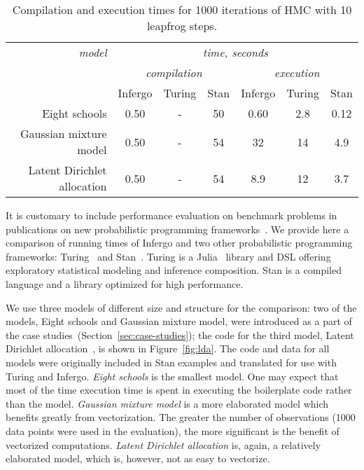 \documentclass[sigplan,screen]{acmart}
\begin{document}
\begin{sloppypar}
\begin{table*}
  \begin{tabular}{r | c |  c | c | c | c | c | }
    {\it model}         & \multicolumn{6}{c|}{\it time, seconds} \\
                  & \multicolumn{3}{c|}{\it compilation} & \multicolumn{3}{c|}{\it execution} \\
                  & Infergo & Turing & Stan              & Infergo  & Turing & Stan    \\\hline
              Eight schools & 0.50    & -      & 50                & 0.60     & 2.8    & 0.12    \\
     Gaussian mixture model & 0.50    & -      & 54                & 32       & 14     & 4.9     \\
Latent Dirichlet allocation & 0.50    & -      & 54                & 8.9      & 12     & 3.7     \\
  \end{tabular}
\caption{Compilation and execution times for 1000 iterations
  of HMC with 10 leapfrog steps.}
\label{tab:memory-runtime}
\end{table*}

It is customary to include performance evaluation on benchmark
problems in publications on new probabilistic programming
frameworks~\cite{PW14,WVM14,TMY+16,GXG18}. We provide here a
comparison of running times of Infergo and two other probabilistic
programming frameworks: Turing~\cite{GXG18} and
Stan~\cite{Stan17}. Turing is a Julia~\cite{Julia14} library
and DSL offering exploratory statistical modeling  and
inference composition. Stan is a compiled language and a library
optimized for high performance.

We use three models of different size and structure for the
comparison: two of the models, Eight schools and Gaussian
mixture model, were introduced as a part of the case
studies~(Section~\ref{sec:case-studies}); the code for the third
model, Latent Dirichlet allocation~\cite{BNG03}, is shown in
Figure~\ref{fig:lda}. The code and data for all models were
originally included in Stan examples and translated for use
with Turing and Infergo. \textit{Eight schools} is the smallest model.
One may expect that most of the time execution time is spent in
executing the boilerplate code rather than the model. \textit{Gaussian
mixture model} is a more elaborated model which benefits greatly
from vectorization. The greater the number of observations (1000
data points were used in the evaluation), the more significant
is the benefit of vectorized computations. \textit{Latent
Dirichlet allocation} is, again, a relatively elaborated model,
which is, however, not as easy to vectorize.


\end{sloppypar}
\end{document}
